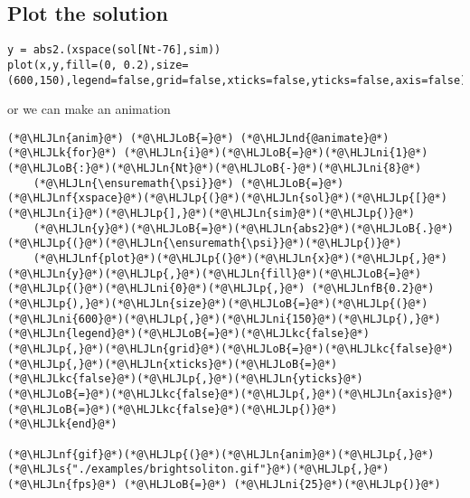 \documentclass[12pt,a4paper]{article}
\newcommand{\HLJLk}[1]{\textcolor[RGB]{148,91,176}{\textbf{#1}}}
\newcommand{\HLJLkc}[1]{\textcolor[RGB]{59,151,46}{\textit{#1}}}
\newcommand{\HLJLn}[1]{#1}
\newcommand{\HLJLnd}[1]{\textcolor[RGB]{214,102,97}{#1}}
\newcommand{\HLJLnf}[1]{\textcolor[RGB]{66,102,213}{#1}}
\newcommand{\HLJLs}[1]{\textcolor[RGB]{201,61,57}{#1}}
\newcommand{\HLJLnfB}[1]{\textcolor[RGB]{59,151,46}{#1}}
\newcommand{\HLJLni}[1]{\textcolor[RGB]{59,151,46}{#1}}
\newcommand{\HLJLoB}[1]{\textcolor[RGB]{102,102,102}{\textbf{#1}}}
\newcommand{\HLJLp}[1]{#1}
\begin{document}
\subsection{Plot the solution}
\begin{verbatim}
y = abs2.(xspace(sol[Nt-76],sim))
plot(x,y,fill=(0, 0.2),size=(600,150),legend=false,grid=false,xticks=false,yticks=false,axis=false)
\end{verbatim}
or we can make an animation



\begin{lstlisting}
(*@\HLJLn{anim}@*) (*@\HLJLoB{=}@*) (*@\HLJLnd{@animate}@*) (*@\HLJLk{for}@*) (*@\HLJLn{i}@*)(*@\HLJLoB{=}@*)(*@\HLJLni{1}@*)(*@\HLJLoB{:}@*)(*@\HLJLn{Nt}@*)(*@\HLJLoB{-}@*)(*@\HLJLni{8}@*)
    (*@\HLJLn{\ensuremath{\psi}}@*) (*@\HLJLoB{=}@*) (*@\HLJLnf{xspace}@*)(*@\HLJLp{(}@*)(*@\HLJLn{sol}@*)(*@\HLJLp{[}@*)(*@\HLJLn{i}@*)(*@\HLJLp{],}@*)(*@\HLJLn{sim}@*)(*@\HLJLp{)}@*)
    (*@\HLJLn{y}@*)(*@\HLJLoB{=}@*)(*@\HLJLn{abs2}@*)(*@\HLJLoB{.}@*)(*@\HLJLp{(}@*)(*@\HLJLn{\ensuremath{\psi}}@*)(*@\HLJLp{)}@*)
    (*@\HLJLnf{plot}@*)(*@\HLJLp{(}@*)(*@\HLJLn{x}@*)(*@\HLJLp{,}@*)(*@\HLJLn{y}@*)(*@\HLJLp{,}@*)(*@\HLJLn{fill}@*)(*@\HLJLoB{=}@*)(*@\HLJLp{(}@*)(*@\HLJLni{0}@*)(*@\HLJLp{,}@*) (*@\HLJLnfB{0.2}@*)(*@\HLJLp{),}@*)(*@\HLJLn{size}@*)(*@\HLJLoB{=}@*)(*@\HLJLp{(}@*)(*@\HLJLni{600}@*)(*@\HLJLp{,}@*)(*@\HLJLni{150}@*)(*@\HLJLp{),}@*)(*@\HLJLn{legend}@*)(*@\HLJLoB{=}@*)(*@\HLJLkc{false}@*)(*@\HLJLp{,}@*)(*@\HLJLn{grid}@*)(*@\HLJLoB{=}@*)(*@\HLJLkc{false}@*)(*@\HLJLp{,}@*)(*@\HLJLn{xticks}@*)(*@\HLJLoB{=}@*)(*@\HLJLkc{false}@*)(*@\HLJLp{,}@*)(*@\HLJLn{yticks}@*)(*@\HLJLoB{=}@*)(*@\HLJLkc{false}@*)(*@\HLJLp{,}@*)(*@\HLJLn{axis}@*)(*@\HLJLoB{=}@*)(*@\HLJLkc{false}@*)(*@\HLJLp{)}@*)
(*@\HLJLk{end}@*)

(*@\HLJLnf{gif}@*)(*@\HLJLp{(}@*)(*@\HLJLn{anim}@*)(*@\HLJLp{,}@*) (*@\HLJLs{"./examples/brightsoliton.gif"}@*)(*@\HLJLp{,}@*) (*@\HLJLn{fps}@*) (*@\HLJLoB{=}@*) (*@\HLJLni{25}@*)(*@\HLJLp{)}@*)
\end{lstlisting}
\end{document}
